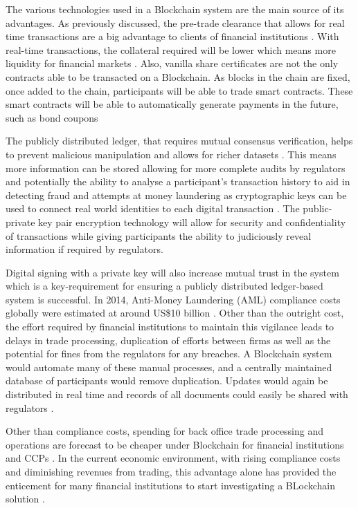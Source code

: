 \documentclass[pdftex]{article}
\begin{document}
The various technologies used in a Blockchain system are the main source of its advantages. As previously discussed, the pre-trade clearance that allows for real time transactions are a big advantage to clients of financial institutions \cite{gentleIntro}. With real-time transactions, the collateral required will be lower which means more liquidity for financial markets \cite{WymanEuro}.
Also, vanilla share certificates are not the only contracts able to be transacted on a Blockchain. As blocks in the chain are fixed, once added to the chain, participants will be able to trade smart contracts. These smart contracts will be able to automatically generate payments in the future, such as bond coupons \cite{DBS}

The publicly distributed ledger, that requires mutual consensus verification, helps to prevent malicious manipulation and allows for richer datasets \cite{WymanEuro}. This means more information can be stored allowing for more complete audits by regulators and potentially the ability to analyse a participant's transaction history to aid in detecting fraud and attempts at money laundering as cryptographic keys can be used to connect real world identities to each digital transaction \cite{Deloitte}. The public-private key pair encryption technology will allow for security and confidentiality of transactions while giving participants the ability to judiciously reveal information if required by regulators\cite{WymanEuro}. 

Digital signing with a private key will also increase mutual trust in the system which is a key-requirement for ensuring a publicly distributed ledger-based system is successful. In 2014, Anti-Money Laundering (AML) compliance costs globally were estimated at around US\$10 billion \cite{KPMG}. Other than the outright cost, the effort required by financial institutions to maintain this vigilance leads to delays in trade processing, duplication of efforts between firms as well as the potential for fines from the regulators for any breaches. A Blockchain system would automate many of these manual processes, and a centrally maintained database of participants would remove duplication. Updates would again be distributed in real time and records of all documents could easily be shared with regulators \cite{Deloitte}. 

Other than compliance costs, spending for back office trade processing and operations are forecast to be cheaper under Blockchain for financial institutions and CCPs \cite{WymanEuro}. In the current economic environment, with rising compliance costs and diminishing revenues from trading, this advantage alone has provided the enticement for many financial institutions to start investigating a BLockchain solution \cite{Deloitte}.
\end{document}
